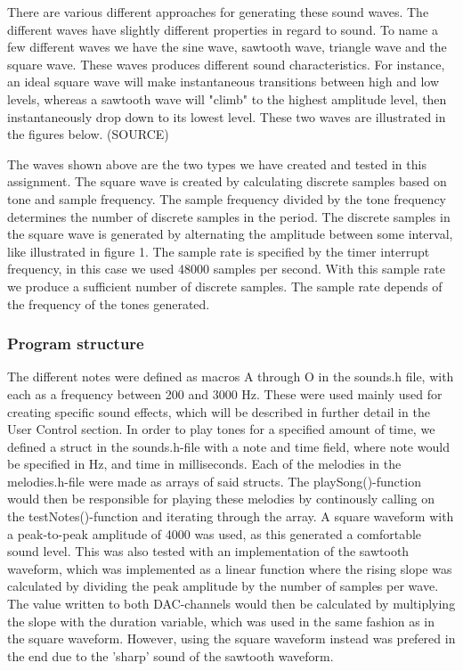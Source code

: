 There are various different approaches for generating these sound waves. The different waves have slightly different properties in regard to sound. To name a few different waves we have the sine wave, sawtooth wave, triangle wave and the square wave. These waves produces different sound characteristics. For instance, an ideal square wave will make instantaneous transitions between high and low levels, whereas a sawtooth wave will "climb" to the highest amplitude level, then instantaneously drop down to its lowest level. These two waves are illustrated in the figures below. (SOURCE)




The waves shown above are the two types we have created and tested in this assignment. The square wave is created by calculating discrete samples based on tone and sample frequency. The sample frequency divided by the tone frequency determines the number of discrete samples in the period. The discrete samples in the square wave is generated by alternating the amplitude between some interval, like illustrated in figure 1. The sample rate is specified by the timer interrupt frequency, in this case we used 48000 samples per second. With this sample rate we produce a sufficient number of discrete samples. The sample rate depends of the frequency of the tones generated.   

 

\subsubsection{Program structure}

The different notes were defined as macros A through O in the sounds.h file, with each as a frequency between 200 and 3000 Hz. These were used mainly used for creating specific sound effects, which will be described in further detail in the User Control section.
	In order to play tones for a specified amount of time, we defined a struct in the sounds.h-file with a note and time field, where note would be specified in Hz, and time in milliseconds. Each of the melodies in the melodies.h-file were made as arrays of said structs. The playSong()-function would then be responsible for playing these melodies by continously calling on the testNotes()-function and iterating through the array. A square waveform with a peak-to-peak amplitude of 4000 was used, as this generated a comfortable sound level. This was also tested with an implementation of the sawtooth waveform, which was implemented as a linear function where the rising slope was calculated by dividing the peak amplitude by the number of samples per wave. The value written to both DAC-channels would then be calculated by multiplying the slope with the duration variable, which was used in the same fashion as in the square waveform. However, using the square waveform instead was prefered in the end due to the 'sharp' sound of the sawtooth waveform.

